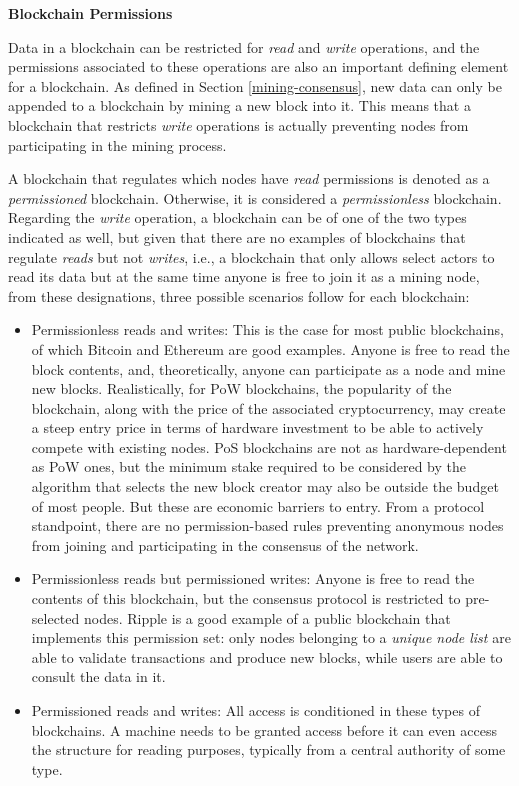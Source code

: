 \documentclass[../access.tex]{subfiles}
\begin{document}
\par
\textbf{Blockchain Permissions}
\par
Data in a blockchain can be restricted for \emph{read} and \emph{write} operations, and the permissions associated to these operations are also an important defining element for a blockchain. As defined in Section \ref{mining-consensus}, new data can only be appended to a blockchain by mining a new block into it. This means that a blockchain that restricts \emph{write} operations is actually preventing nodes from participating in the mining process.
\par
A blockchain that regulates which nodes have \emph{read} permissions is denoted as a \textit{permissioned} blockchain. Otherwise, it is considered a \textit{permissionless} blockchain. Regarding the \emph{write} operation, a blockchain can be of one of the two types indicated as well, but given that there are no examples of blockchains that regulate \emph{reads} but not \emph{writes}, i.e., a blockchain that only allows select actors to read its data but at the same time anyone is free to join it as a mining node, from these designations, three possible scenarios follow for each blockchain:
\begin{itemize}
    \item{Permissionless reads and writes: This is the case for most public blockchains, of which Bitcoin and Ethereum are good examples. Anyone is free to read the block contents, and, theoretically, anyone can participate as a node and mine new blocks. Realistically, for PoW blockchains, the popularity of the blockchain, along with the price of the associated cryptocurrency, may create a steep entry price in terms of hardware investment to be able to actively compete with existing nodes. PoS blockchains are not as hardware-dependent as PoW ones, but the minimum stake required to be considered by the algorithm that selects the new block creator may also be outside the budget of most people. But these are economic barriers to entry. From a protocol standpoint, there are no permission-based rules preventing anonymous nodes from joining and participating in the consensus of the network.}

    \item{Permissionless reads but permissioned writes: Anyone is free to read the contents of this blockchain, but the consensus protocol is restricted to pre-selected nodes. Ripple is a good example of a public blockchain that implements this permission set: only nodes belonging to a \textit{unique node list} are able to validate transactions and produce new blocks, while users are able to consult the data in it.}

    \item{Permissioned reads and writes: All access is conditioned in these types of blockchains. A machine needs to be granted access before it can even access the structure for reading purposes, typically from a central authority of some type.}
\end{itemize}
\end{document}
